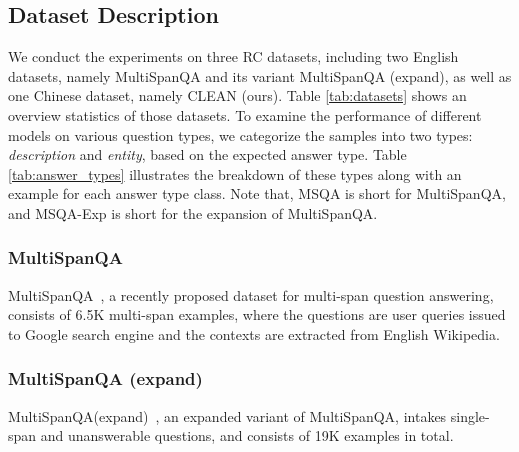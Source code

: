 \documentclass[a4paper]{cas-sc}
\newcommand{\1}[1]{\mathds{1}\left[#1\right]}
\newcommand{\tableref}[1]{Table \ref{#1}}
\begin{document}

\subsection{Dataset Description} 
\label{sec:dataset}
We conduct the experiments  on three RC datasets, including
two English datasets, namely MultiSpanQA and its variant MultiSpanQA (expand), as well as one Chinese dataset, namely CLEAN (ours).
\tableref{tab:datasets} shows an overview statistics of those datasets.
To examine the performance of different models on various question types, 
we categorize the samples into two types: \emph{description} and \emph{entity}, 
based on the expected answer type. \tableref{tab:answer_types} illustrates the breakdown of these types along with an example for each answer type class.
Note that, MSQA is short for MultiSpanQA, and MSQA-Exp is short for the expansion of MultiSpanQA.


\subsubsection*{MultiSpanQA} 
MultiSpanQA~\citep{li2022multispanqa}, a recently proposed dataset for multi-span question answering, consists of 6.5K multi-span examples, where the questions are user queries issued to Google search engine and the contexts are extracted from English Wikipedia. 
\subsubsection*{MultiSpanQA (expand)}
MultiSpanQA(expand)~\citep{li2022multispanqa}, an expanded variant of MultiSpanQA, intakes single-span and unanswerable questions, and consists of 19K examples in total.
\end{document}
